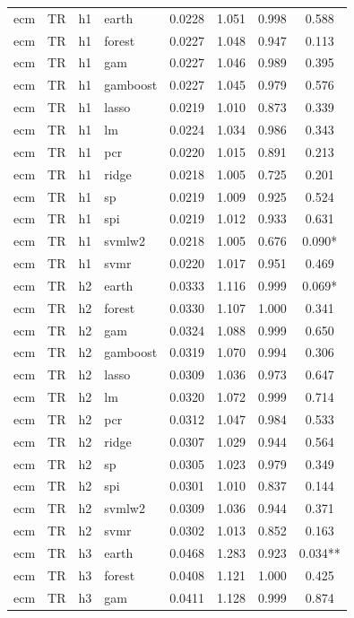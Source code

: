 \begin{ThreePartTable}
\begin{longtable}[t]{llclcccc}
\addlinespace
ecm & TR & h1 & earth & 0.0228 & 1.051 & 0.998 & 0.588\\
ecm & TR & h1 & forest & 0.0227 & 1.048 & 0.947 & 0.113\\
ecm & TR & h1 & gam & 0.0227 & 1.046 & 0.989 & 0.395\\
ecm & TR & h1 & gamboost & 0.0227 & 1.045 & 0.979 & 0.576\\
ecm & TR & h1 & lasso & 0.0219 & 1.010 & 0.873 & 0.339\\
ecm & TR & h1 & lm & 0.0224 & 1.034 & 0.986 & 0.343\\
ecm & TR & h1 & pcr & 0.0220 & 1.015 & 0.891 & 0.213\\
ecm & TR & h1 & ridge & 0.0218 & 1.005 & 0.725 & 0.201\\
ecm & TR & h1 & sp & 0.0219 & 1.009 & 0.925 & 0.524\\
ecm & TR & h1 & spi & 0.0219 & 1.012 & 0.933 & 0.631\\
ecm & TR & h1 & svmlw2 & 0.0218 & 1.005 & 0.676 & 0.090*\\
ecm & TR & h1 & svmr & 0.0220 & 1.017 & 0.951 & 0.469\\
\addlinespace
ecm & TR & h2 & earth & 0.0333 & 1.116 & 0.999 & 0.069*\\
ecm & TR & h2 & forest & 0.0330 & 1.107 & 1.000 & 0.341\\
ecm & TR & h2 & gam & 0.0324 & 1.088 & 0.999 & 0.650\\
ecm & TR & h2 & gamboost & 0.0319 & 1.070 & 0.994 & 0.306\\
ecm & TR & h2 & lasso & 0.0309 & 1.036 & 0.973 & 0.647\\
ecm & TR & h2 & lm & 0.0320 & 1.072 & 0.999 & 0.714\\
ecm & TR & h2 & pcr & 0.0312 & 1.047 & 0.984 & 0.533\\
ecm & TR & h2 & ridge & 0.0307 & 1.029 & 0.944 & 0.564\\
ecm & TR & h2 & sp & 0.0305 & 1.023 & 0.979 & 0.349\\
ecm & TR & h2 & spi & 0.0301 & 1.010 & 0.837 & 0.144\\
ecm & TR & h2 & svmlw2 & 0.0309 & 1.036 & 0.944 & 0.371\\
ecm & TR & h2 & svmr & 0.0302 & 1.013 & 0.852 & 0.163\\
\addlinespace
ecm & TR & h3 & earth & 0.0468 & 1.283 & 0.923 & 0.034**\\
ecm & TR & h3 & forest & 0.0408 & 1.121 & 1.000 & 0.425\\
ecm & TR & h3 & gam & 0.0411 & 1.128 & 0.999 & 0.874\\

\end{longtable}
\end{ThreePartTable}
